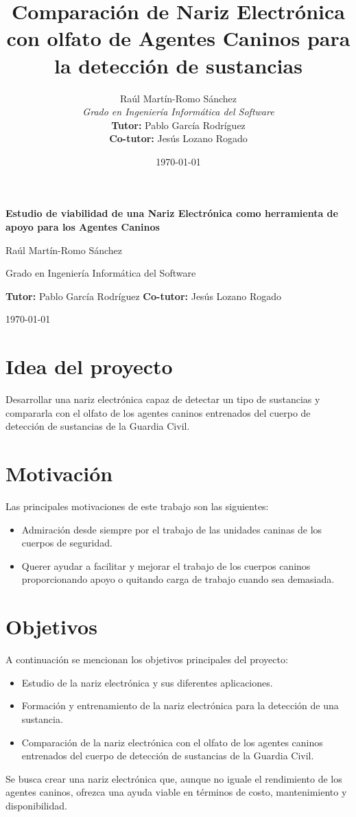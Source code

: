 \documentclass[12pt,a4paper,oneside]{report}
\title{Comparación de Nariz Electrónica con olfato de Agentes Caninos para la detección de sustancias}
\author{Raúl Martín-Romo Sánchez\\
	\textit{Grado en Ingeniería Informática del Software}\\
	\textbf{Tutor:} Pablo García Rodríguez\\
    \textbf{Co-tutor:} Jesús Lozano Rogado}
\date{\today}
\begin{document}
\begingroup
\begin{center}
	{\LARGE \textbf{Estudio de viabilidad de una Nariz Electrónica como herramienta de apoyo para los Agentes Caninos}\par}
	\vspace{1em}
	{\large Raúl Martín-Romo Sánchez\par}
	{\small Grado en Ingeniería Informática del Software\par}
	\vspace{0.5em}
	{\small \textbf{Tutor:} Pablo García Rodríguez \quad \textbf{Co-tutor:} Jesús Lozano Rogado\par}
	\vspace{1em}
	{\small \today\par}
\end{center}
\bigskip
\endgroup

\section{Idea del proyecto}
Desarrollar una nariz electrónica capaz de detectar un tipo de  sustancias y compararla con el olfato de los agentes caninos entrenados del cuerpo de detección de sustancias de la Guardia Civil.

\section{Motivación}
Las principales motivaciones de este trabajo son las siguientes:
\begin{itemize}
	\item Admiración desde siempre por el trabajo de las unidades caninas de los cuerpos de seguridad.
	\item Querer ayudar a facilitar y mejorar el trabajo de los cuerpos caninos proporcionando apoyo o quitando carga de trabajo cuando sea demasiada.
\end{itemize}

\section{Objetivos}
A continuación se mencionan los objetivos principales del proyecto:
\begin{itemize}
	\item Estudio de la nariz electrónica y sus diferentes aplicaciones.
	\item Formación y entrenamiento de la nariz electrónica para la detección de una sustancia.
	\item Comparación de la nariz electrónica con el olfato de los agentes caninos entrenados del cuerpo de detección de sustancias de la Guardia Civil.
\end{itemize}
Se busca crear una nariz electrónica que, aunque no iguale el rendimiento de los agentes caninos, ofrezca una ayuda viable en términos de costo, mantenimiento y disponibilidad.
\end{document}
